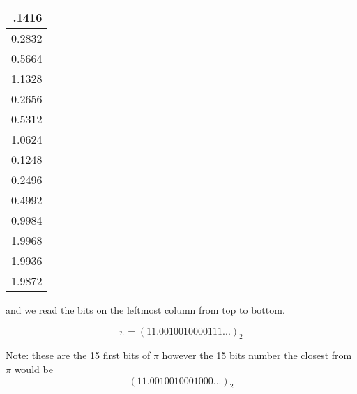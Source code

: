 \documentclass[pdftex,11pt]{article}
\begin{document}
\begin{tabular}{r}
 .1416 \\
\hline
0.2832\\
0.5664\\
1.1328\\
0.2656\\
0.5312\\
1.0624\\
0.1248\\
0.2496\\
0.4992\\
0.9984\\
1.9968\\
1.9936\\
1.9872
\end{tabular}

and we read the bits on the leftmost column from top to bottom.

        \[ \pi = (11.0010010000111...)_2 \]

Note: these are the 15 first bits of $\pi$ however the 15 bits number the closest from $\pi$ would be
        \[ (11.0010010001000...)_2 \]
\end{document}
